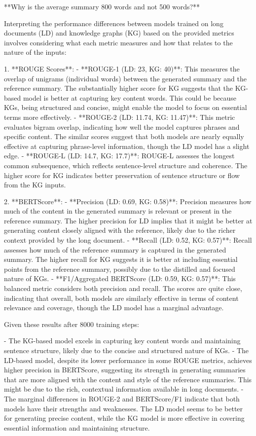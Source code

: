 \documentclass[12pt]{article}
\begin{document}
**Why is the average summary 800 words and not 500 words?**

Interpreting the performance differences between models trained on long documents (LD) and knowledge graphs (KG) based on the  provided metrics involves considering what each metric measures and how that relates to the nature of the inputs:

1. **ROUGE Scores**:
   - **ROUGE-1 (LD: 23, KG: 40)**: This measures the overlap of unigrams (individual words) between the generated summary and the reference summary. The substantially higher score for KG suggests that the KG-based model is better at capturing key content words. This could be because KGs, being structured and concise, might enable the model to focus on essential terms more effectively.
   - **ROUGE-2 (LD: 11.74, KG: 11.47)**: This metric evaluates bigram overlap, indicating how well the model captures phrases and specific content. The similar scores suggest that both models are nearly equally effective at capturing phrase-level information, though the LD model has a slight edge.
   - **ROUGE-L (LD: 14.7, KG: 17.7)**: ROUGE-L assesses the longest common subsequence, which reflects sentence-level structure and coherence. The higher score for KG indicates better preservation of sentence structure or flow from the KG inputs.

2. **BERTScore**:
   - **Precision (LD: 0.69, KG: 0.58)**: Precision measures how much of the content in the generated summary is relevant or present in the reference summary. The higher precision for LD implies that it might be better at generating content closely aligned with the reference, likely due to the richer context provided by the long document.
   - **Recall (LD: 0.52, KG: 0.57)**: Recall assesses how much of the reference summary is captured in the generated summary. The higher recall for KG suggests it is better at including essential points from the reference summary, possibly due to the distilled and focused nature of KGs.
   - **F1/Aggregated BERTScore (LD: 0.59, KG: 0.57)**: This balanced metric considers both precision and recall. The scores are quite close, indicating that overall, both models are similarly effective in terms of content relevance and coverage, though the LD model has a marginal advantage.

Given these results after 8000 training steps:

- The KG-based model excels in capturing key content words and maintaining sentence structure, likely due to the concise and structured nature of KGs. 
- The LD-based model, despite its lower performance in some ROUGE metrics, achieves higher precision in BERTScore, suggesting its strength in generating summaries that are more aligned with the content and style of the reference summaries. This might be due to the rich, contextual information available in long documents.
- The marginal differences in ROUGE-2 and BERTScore/F1 indicate that both models have their strengths and weaknesses. The LD model seems to be better for generating precise content, while the KG model is more effective in covering essential information and maintaining structure.
\end{document}
